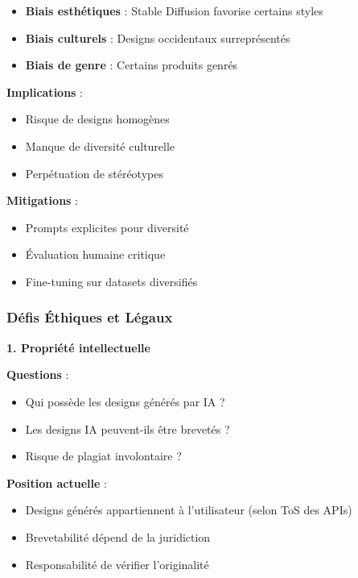 \begin{itemize}[leftmargin=*]
    \item \textbf{Biais esthétiques} : Stable Diffusion favorise certains styles
    \item \textbf{Biais culturels} : Designs occidentaux surreprésentés
    \item \textbf{Biais de genre} : Certains produits genrés
\end{itemize}

\textbf{Implications} :
\begin{itemize}[leftmargin=*]
    \item Risque de designs homogènes
    \item Manque de diversité culturelle
    \item Perpétuation de stéréotypes
\end{itemize}

\textbf{Mitigations} :
\begin{itemize}[leftmargin=*]
    \item Prompts explicites pour diversité
    \item Évaluation humaine critique
    \item Fine-tuning sur datasets diversifiés
\end{itemize}

\subsubsection{Défis Éthiques et Légaux}

\textbf{1. Propriété intellectuelle}

\textbf{Questions} :
\begin{itemize}[leftmargin=*]
    \item Qui possède les designs générés par IA ?
    \item Les designs IA peuvent-ils être brevetés ?
    \item Risque de plagiat involontaire ?
\end{itemize}

\textbf{Position actuelle} :
\begin{itemize}[leftmargin=*]
    \item Designs générés appartiennent à l'utilisateur (selon ToS des APIs)
    \item Brevetabilité dépend de la juridiction
    \item Responsabilité de vérifier l'originalité
\end{itemize}

